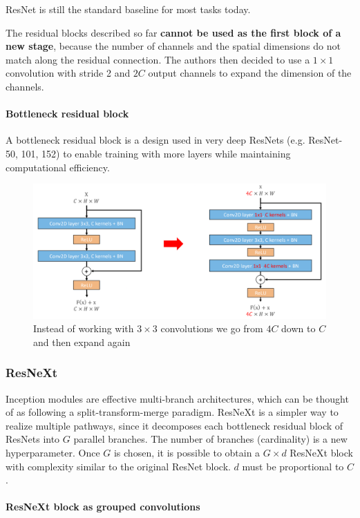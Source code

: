 \documentclass{article}
\begin{document}
ResNet is still the standard baseline for most tasks today.

The residual blocks described so far \textbf{cannot be used as the first block of a new stage}, because the number of channels and the spatial dimensions do not match along the residual connection.
The authors then decided to use a $1\times 1$ convolution with stride 2 and $2C$ output channels to expand the dimension of the channels.

\paragraph{Bottleneck residual block}
A bottleneck residual block is a design used in very deep ResNets (e.g. ResNet-50, 101, 152) to enable training with more layers while maintaining computational efficiency.
\begin{figure}[htbp]
  \centering
  \includegraphics[width=0.8\linewidth]{./img/resnet_bottleneck.png}
  \caption{Instead of working with $3 \times 3$ convolutions we go from $4C$ down to $C$ and then expand again}
\end{figure}

\subsubsection{ResNeXt}
Inception modules are effective multi-branch architectures, which can be thought of as following a split-transform-merge paradigm.
ResNeXt is a simpler way to realize multiple pathways, since it decomposes each bottleneck residual block of ResNets into $G$ parallel branches.
The number of branches (cardinality) is a new hyperparameter.
Once $G$ is chosen, it is possible to obtain a $G \times d$ ResNeXt block with complexity similar to the original ResNet block.
$d$ must be proportional to $C$.

\paragraph{ResNeXt block as grouped convolutions}
\end{document}

